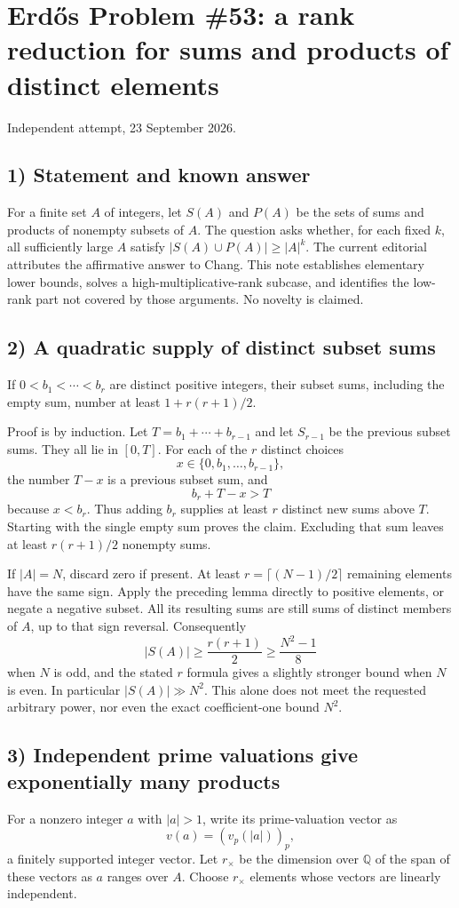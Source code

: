 \section{Erd\H{o}s Problem \#53: a rank reduction for sums and products of distinct elements}
\noindent Independent attempt, 23 September 2026.

\subsection*{1) Statement and known answer}
For a finite set $A$ of integers, let $S(A)$ and $P(A)$ be the sets of sums and products of nonempty subsets of $A$. The question asks whether, for each fixed $k$, all sufficiently large $A$ satisfy $|S(A)\cup P(A)|\ge|A|^k$. The current editorial attributes the affirmative answer to Chang. This note establishes elementary lower bounds, solves a high-multiplicative-rank subcase, and identifies the low-rank part not covered by those arguments. No novelty is claimed.

\subsection*{2) A quadratic supply of distinct subset sums}
If $0<b_1<\cdots<b_r$ are distinct positive integers, their subset sums, including the empty sum, number at least $1+r(r+1)/2$.

Proof is by induction. Let $T=b_1+\cdots+b_{r-1}$ and let $S_{r-1}$ be the previous subset sums. They all lie in $[0,T]$. For each of the $r$ distinct choices
\[
 x\in\{0,b_1,\ldots,b_{r-1}\},
\]
the number $T-x$ is a previous subset sum, and
\[
 b_r+T-x>T
\]
because $x<b_r$. Thus adding $b_r$ supplies at least $r$ distinct new sums above $T$. Starting with the single empty sum proves the claim. Excluding that sum leaves at least $r(r+1)/2$ nonempty sums.

If $|A|=N$, discard zero if present. At least $r=\lceil(N-1)/2\rceil$ remaining elements have the same sign. Apply the preceding lemma directly to positive elements, or negate a negative subset. All its resulting sums are still sums of distinct members of $A$, up to that sign reversal. Consequently
\[
 |S(A)|\ge\frac{r(r+1)}2\ge\frac{N^2-1}{8}
\]
when $N$ is odd, and the stated $r$ formula gives a slightly stronger bound when $N$ is even. In particular $|S(A)|\gg N^2$. This alone does not meet the requested arbitrary power, nor even the exact coefficient-one bound $N^2$.

\subsection*{3) Independent prime valuations give exponentially many products}
For a nonzero integer $a$ with $|a|>1$, write its prime-valuation vector as
\[
 v(a)=(v_p(|a|))_p,
\]
a finitely supported integer vector. Let $r_\times$ be the dimension over $\mathbb Q$ of the span of these vectors as $a$ ranges over $A$. Choose $r_\times$ elements whose vectors are linearly independent.


